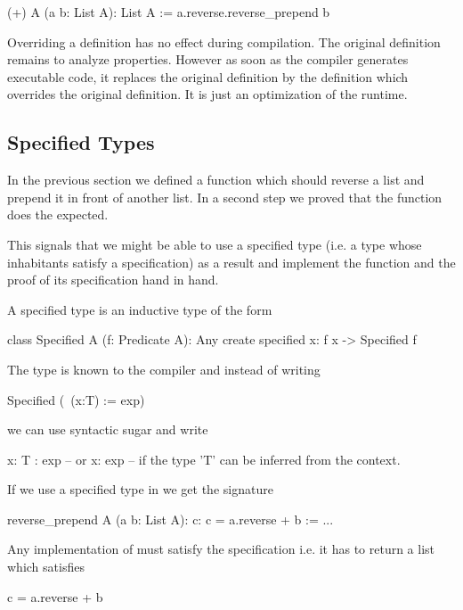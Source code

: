 \begin{alba}
  (+) A (a b: List A): List A :=
    a.reverse.reverse_prepend b
\end{alba}

Overriding a definition has no effect during compilation. The original
definition remains to analyze properties. However as soon as the compiler
generates executable code, it replaces the original definition by the
definition which overrides the original definition. It is just an optimization
of the runtime.





\subsection{Specified Types}

In the previous section we defined a function  which
should reverse a list and prepend it in front of another list. In a second
step we proved that the function does the expected.

This signals that we might be able to use a specified type (i.e. a type whose
inhabitants satisfy a specification) as a result and implement the function
and the proof of its specification hand in hand.

A specified type is an inductive type of the form
%
\begin{alba}
   class Specified A (f: Predicate A): Any create
     specified x: f x -> Specified f
\end{alba}

The type  is known to the compiler and instead of writing
%
\begin{alba}
  Specified (\ (x:T) := exp)
\end{alba}
%
we can use syntactic sugar and write
%
\begin{alba}
  {x: T : exp}
  -- or
  {x: exp}     -- if the type 'T' can be inferred from the context.
\end{alba}


If we use a specified type in  we get the signature
\begin{alba}
  reverse_prepend A (a b: List A): {c: c = a.reverse + b} :=
    ...
\end{alba}

Any implementation of  must satisfy the specification
i.e. it has to return a list  which satisfies
\begin{alba}
  c = a.reverse + b
\end{alba}


